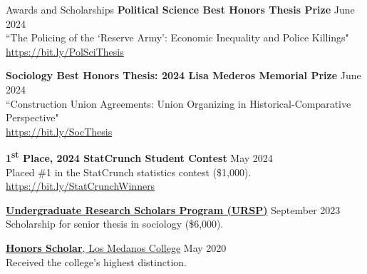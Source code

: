 \documentclass[
	11pt, %
]{resume} %
\begin{document}
\begin{samepage}
\begin{rSection}{Awards and Scholarships}
\textbf{Political Science Best Honors Thesis Prize} \hfill June 2024 \\
``The Policing of the `Reserve Army': Economic Inequality and Police Killings"\\
\href{https://bit.ly/PolSciThesis}{https://bit.ly/PolSciThesis}

\textbf{Sociology Best Honors Thesis: 2024 Lisa Mederos Memorial Prize} \hfill June 2024\\
``Construction Union Agreements: Union Organizing in Historical-Comparative Perspective"\\
\href{https://bit.ly/SocThesis}{https://bit.ly/SocThesis}

\textbf{1\textsuperscript{st} Place, 2024 StatCrunch Student Contest} \hfill May 2024\\
Placed \#1 in the StatCrunch statistics contest (\$\thinspace{}1,000).\\
\href{https://bit.ly/StatCrunchWinners}{https://bit.ly/StatCrunchWinners}

\href{https://hass.ugresearch.ucla.edu/scholarships/ursp/students/}{\textbf{Undergraduate Research Scholars Program (URSP)}} \hfill September 2023 \\
Scholarship for senior thesis in sociology (\$\thinspace{}6,000).

\href{https://www.losmedanos.edu/honors/prog.aspx\#:~:text=Honors\%20Scholar\%20Requirements}{\textbf{Honors Scholar}, Los Medanos College} \hfill May 2020 \\
Received the college’s highest distinction.
\end{rSection}
\end{samepage}
\end{document}
